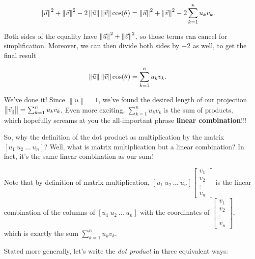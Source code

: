 \documentclass{ximera}
\begin{document}
\begin{explanation}
      $$\left\|\vec{u}\right\|^2+\left\|\vec{v}\right\|^2-2\left\|\vec{u}\right\|\left\|\vec{v}\right\|\cos(\theta)=\left\|\vec{u}\right\|^2+\left\|\vec{v}\right\|^2-2\sum_{k=1}^nu_kv_k.$$

      Both sides of the equality have $\left\|\vec{u}\right\|^2+\left\|\vec{v}\right\|^2$, so those terms can cancel for simplification. Moreover, we can then divide both sides by $-2$ as well, to get the final result

      $$\left\|\vec{u}\right\|\left\|\vec{v}\right\|\cos(\theta)=\sum_{k=1}^nu_kv_k.$$

      We've done it! Since $\left\|u\right\|=1$, we've found the desired length of our projection $\left\|\vec{v}_\parallel\right\|=\sum_{k=1}^nu_kv_k$. Even more exciting, $\sum_{k=1}^nu_kv_k$ is the sum of products, which hopefully screams at you the all-important phrase {\bf linear combination}!!!

      So, why the definition of the dot product as multiplication by the matrix $[u_1\ u_2\ \ldots\ u_n]$? Well, what is matrix multiplication but a linear combination? In fact, it's the same linear combination as our sum!

      Note that by definition of matrix multiplication, $[u_1\ u_2\ \ldots\ u_n]\begin{bmatrix}
        v_1\\v_2\\\vdots\\v_n
      \end{bmatrix}$ is the linear combination of the columns of $[u_1\ u_2\ \ldots\ u_n]$ with the coordinates of $\begin{bmatrix}
        v_1\\v_2\\\vdots\\v_n
      \end{bmatrix}$, which is exactly the sum $\sum_{k=1}^nu_kv_k$.

     \end{explanation}

    Stated more generally, let's write the \emph{dot product} in three equivalent ways:
\end{document}
